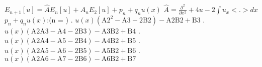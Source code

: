\documentclass[12pt,a4paper]{article}
\begin{document}
\newline
\newline
\newline
\newline
$E_{n + 1} [u] = \widehat{A} E_n [u] + A_n E_2 [u] + p_n + q_n u(x)$
\newline
$\widehat{A} = \frac{\partial^2}{\partial x^2} + 4u - 2 \int u_{x} <.> dx$
\newline
$p_n + q_n u(x)$:(n = )
. $u(x) \left(\text{A2}^2-\text{A3}-2 \text{B2}\right)-\text{A2} \text{B2}+\text{B3}$
. $u(x) (\text{A2} \text{A3}-\text{A4}-2 \text{B3})-\text{A3} \text{B2}+\text{B4}$
. $u(x) (\text{A2} \text{A4}-\text{A5}-2 \text{B4})-\text{A4} \text{B2}+\text{B5}$
. $u(x) (\text{A2} \text{A5}-\text{A6}-2 \text{B5})-\text{A5} \text{B2}+\text{B6}$
. $u(x) (\text{A2} \text{A6}-\text{A7}-2 \text{B6})-\text{A6} \text{B2}+\text{B7}$
\end{document}

